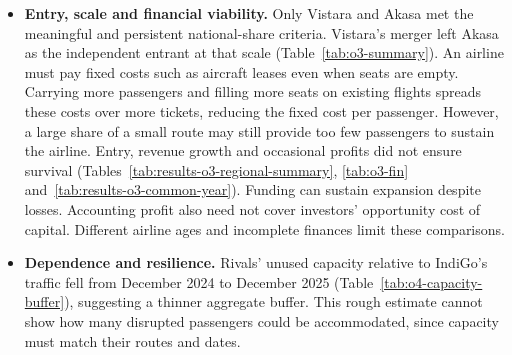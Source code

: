 \begin{itemize}[itemsep=0pt,parsep=0pt,topsep=4pt]
\item \label{sec:review-o3-interpretation}\textbf{Entry, scale and financial viability.} Only Vistara and Akasa met the meaningful and persistent national-share criteria. Vistara's merger left Akasa as the independent entrant at that scale (Table~\ref{tab:o3-summary}). An airline must pay fixed costs such as aircraft leases even when seats are empty. Carrying more passengers and filling more seats on existing flights spreads these costs over more tickets, reducing the fixed cost per passenger. However, a large share of a small route may still provide too few passengers to sustain the airline. Entry, revenue growth and occasional profits did not ensure survival (Tables~\ref{tab:results-o3-regional-summary}, \ref{tab:o3-fin} and~\ref{tab:results-o3-common-year}). Funding can sustain expansion despite losses. Accounting profit also need not cover investors' opportunity cost of capital. Different airline ages and incomplete finances limit these comparisons.

\item \textbf{Dependence and resilience.} Rivals' unused capacity relative to IndiGo's traffic fell from December 2024 to December 2025 (Table~\ref{tab:o4-capacity-buffer}), suggesting a thinner aggregate buffer. This rough estimate cannot show how many disrupted passengers could be accommodated, since capacity must match their routes and dates.
\end{itemize}
